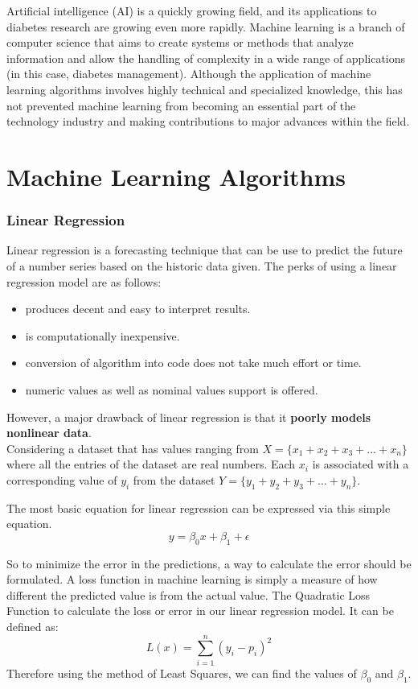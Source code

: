 \documentclass[12pt]{article}
\begin{document}
Artificial intelligence (AI) is a quickly growing field, and its applications to diabetes research are growing even more rapidly. Machine learning is a branch of computer science that aims to create systems or methods that analyze information and allow the handling of complexity in a wide range of applications (in this case, diabetes management). Although the application of machine learning algorithms involves highly technical and specialized knowledge, this has not prevented machine learning from becoming an essential part of the technology industry and making contributions to major advances within the field. 

\newpage
\part{Machine Learning Algorithms}
\section{Linear Regression}
Linear regression is a forecasting technique that can be use to predict the future of a number series based on the historic data given. The perks of using a linear regression model are as follows:

\begin{itemize}
  \item produces decent and  easy to interpret results.
  \item is computationally inexpensive.
  \item conversion of algorithm into code does not take much effort or time.
  \item numeric values as well as nominal values support is offered.
\end{itemize}

However, a major drawback of linear regression is that it \textbf{poorly models nonlinear data}.
\\
Considering a dataset that has values ranging from 
$X = \lbrace x_{1}+x_{2}+x_{3}+...+x_{n} \rbrace$ where
all the entries of the dataset are real numbers. Each $x_{i}$ is associated with a corresponding value of $y_{i}$ from the dataset $Y = \lbrace y_{1}+y_{2}+y_{3}+...+y_{n} \rbrace$.

The most basic equation for linear regression can be expressed via this simple equation.
$$y = \beta_{0}x+\beta_{1}+\epsilon$$

So to minimize the error in the predictions, a way to calculate the error should be formulated. A loss function in machine learning is simply a measure of how different the predicted value is from the actual value. The Quadratic Loss Function to calculate the loss or error in our linear regression model. It can be defined as:
$$L(x) = \sum_{i=1}^{n}(y_{i}-p_{i})^{2} $$
Therefore using the method of Least Squares, we can find the values of $\beta_{0}$ and $\beta_{1}$.
\end{document}
